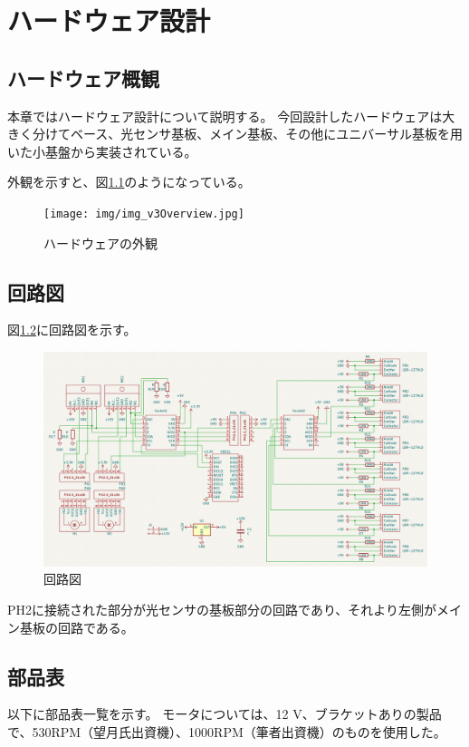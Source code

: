 \documentclass{ltjsreport}
\begin{document}
\chapter{ハードウェア設計}\label{cha:hardware}
\section{ハードウェア概観}
本章ではハードウェア設計について説明する。
今回設計したハードウェアは大きく分けてベース、光センサ基板、メイン基板、その他にユニバーサル基板を用いた小基盤から実装されている。


外観を示すと、図\ref{fig:overview}のようになっている。
\begin{figure}[tbh]
  \centering
  \texttt{[image: img/img\_v3Overview.jpg]}
  \caption{ハードウェアの外観}
  \label{fig:overview}
 \end{figure}




\section{回路図}
図\ref{fig:circuit}に回路図を示す。

\begin{figure}[tbh]
  \centering
  \includegraphics[keepaspectratio, scale=0.35]
       {img/figure_all_circuit.png}
  \caption{回路図}
  \label{fig:circuit}
 \end{figure}

PH2に接続された部分が光センサの基板部分の回路であり、それより左側がメイン基板の回路である。


\section{部品表}
以下に部品表一覧を示す。
モータについては、12 V、ブラケットありの製品で、530RPM（望月氏出資機）、1000RPM（筆者出資機）のものを使用した。
\end{document}
